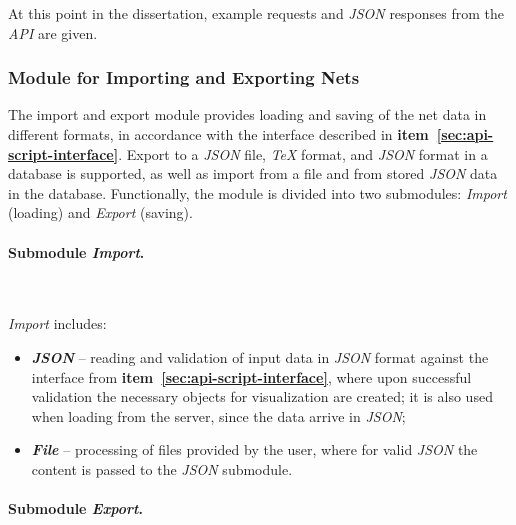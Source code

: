 	At this point in the dissertation, example requests and \textit{JSON} responses from the \textit{API} are given.
	
	\subsubsection{Module for Importing and Exporting Nets}
	\hspace*{2.5em}The import and export module provides loading and saving of the net data in different formats, in accordance with the interface described in \textbf{item~\ref{sec:api-script-interface}}. Export to a \textit{JSON} file, \textit{TeX} format, and \textit{JSON} format in a database is supported, as well as import from a file and from stored \textit{JSON} data in the database. Functionally, the module is divided into two submodules: \textit{Import} (loading) and \textit{Export} (saving).
	
	\paragraph{Submodule \textit{Import}.}
	\mbox{}\\
	
	\vspace{-0.35cm}
	
	\textit{Import} includes:
	\vspace{-0.15cm}
	\begin{itemize}
		\item \textbf{\textit{JSON}} -- reading and validation of input data in \textit{JSON} format against the interface from \textbf{item~\ref{sec:api-script-interface}}, where upon successful validation the necessary objects for visualization are created; it is also used when loading from the server, since the data arrive in \textit{JSON};
		\item \textbf{\textit{File}} -- processing of files provided by the user, where for valid \textit{JSON} the content is passed to the \textit{JSON} submodule.
	\end{itemize}
	
	\paragraph{Submodule \textit{Export}.}
	\mbox{}\\
	
	\vspace{-0.35cm}
	
